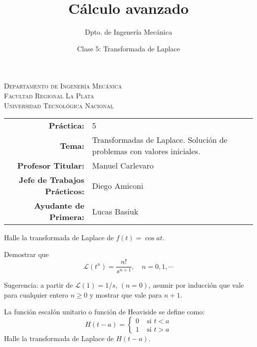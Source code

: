 \documentclass[11pt]{article}
\title{Cálculo avanzado}
\author{Dpto. de Ingenería Mecánica}
\date{Clase 5: Transformada de Laplace}
\begin{document}

\begin{center}
\end{center} 

\begin{center}
\vspace{\baselineskip}
\Large{\textsc{Departamento de Ingenería Mecánica}} \\
\textsc{Facultad Regional La Plata} \\
\textsc{Universidad Tecnológica Nacional}
\end{center}


\begin{center}
\begin{tabular}{r l}
    \textbf{Práctica:} & 5 \\
 \textbf{Tema:} & Transformadas de Laplace. Solución de problemas con valores iniciales.\\
 \textbf{Profesor Titular:} & Manuel Carlevaro \\
 \textbf{Jefe de Trabajos Prácticos:} & Diego Amiconi \\
 \textbf{Ayudante de Primera:} & Lucas Basiuk 
\end{tabular}\end{center}

\vspace{1em}

\begin{question} %
    Halle la transformada de Laplace de $f(t) = \cos at$.
\end{question}

\begin{question}
Demostrar que 
\[ \mathscr{L}(t^n) = \frac{n!}{s^{n + 1}}, \quad n = 0, 1, \cdots \] 

Sugerencia: a partir de $\mathscr{L}(1) = 1 / s, \, (n = 0)$, asumir por inducción que vale para cualquier entero $n \geq 0$ y mostrar que vale para $n + 1$.
\end{question}

\begin{question} %
La función escalón unitario o función de Heaviside se define como:
\[ H(t - a) = 
    \begin{cases}
    0 & \text{ si } t < a\\
    1 & \text{ si } t > a
    \end{cases}
\]
Halle la transformada de Laplace de $H(t - a)$.
\end{question}
\end{document}
